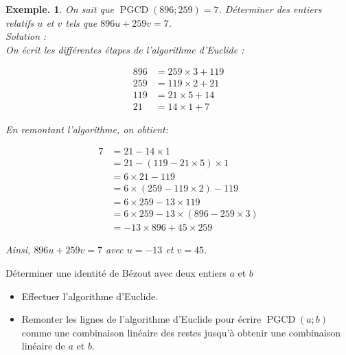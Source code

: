 \documentclass[12pt]{article}
\theoremstyle{break}
\newtheorem*{example}{Exemple.}
\begin{document}
\begin{example}
On sait que $\operatorname{PGCD}(896 ; 259)=7$. Déterminer des entiers relatifs $u$ et $v$ tels que $896 u+259 v=7$. 
~\\Solution :\\
On écrit les différentes étapes de l'algorithme d'Euclide :

$$
\begin{aligned}
896 & =259 \times 3+119 \\
259 & =119 \times 2+21 \\
119 & =21 \times 5+14 \\
21 & =14 \times 1+7
\end{aligned}
$$

En remontant l'algorithme, on obtient:

$$
\begin{aligned}
7 & =21-14 \times 1 \\
& =21-(119-21 \times 5) \times 1 \\
& =6 \times 21-119 \\
& =6 \times(259-119 \times 2)-119 \\
& =6 \times 259-13 \times 119 \\
& =6 \times 259-13 \times(896-259 \times 3) \\
& =-13 \times 896+45 \times 259
\end{aligned}
$$

Ainsi, $896 u+259 v=7$ avec $u=-13$ et $v=45$.
\end{example}

\begin{method}{Déterminer une identité de Bézout avec deux entiers $a$ et $b$}{}
\begin{itemize}[noitemsep,topsep=0pt]
  \item Effectuer l'algorithme d'Euclide.
  \item Remonter les lignes de l'algorithme d'Euclide pour écrire $\operatorname{PGCD}(a ; b)$ comme une combinaison linéaire des restes jusqu'à obtenir une combinaison linéaire de $a$ et $b$.
\end{itemize}
\end{method}
\end{document}
